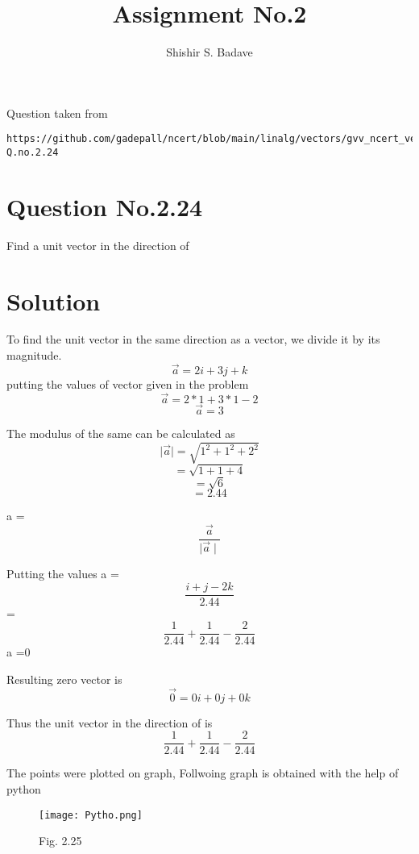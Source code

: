 \documentclass[journal,12pt,twocolumn]{IEEEtran}
\begin{document}
\makeatother
\let\StandardTheFigure\thefigure
\let\vec\mathbf
\renewcommand{\thefigure}{\theproblem}
\def\putbox#1#2#3{\makebox[0in][l]{\makebox[#1][l]{}\raisebox{\baselineskip}[0in][0in]{\raisebox{#2}[0in][0in]{#3}}}}
     \def\rightbox#1{\makebox[0in][r]{#1}}
     \def\centbox#1{\makebox[0in]{#1}}
     \def\topbox#1{\raisebox{-\baselineskip}[0in][0in]{#1}}
     \def\midbox#1{\raisebox{-0.5\baselineskip}[0in][0in]{#1}}
\vspace{3cm}
\title{Assignment No.2}
\author{Shishir S. Badave}
\maketitle
\newpage
\bigskip
\renewcommand{\thefigure}{\theenumi}
\renewcommand{\thetable}{\theenumi}

Question taken from
\begin{lstlisting}
https://github.com/gadepall/ncert/blob/main/linalg/vectors/gvv_ncert_vectors.pdf- Q.no.2.24 
\end{lstlisting}
%
\section{Question No.2.24}
Find a unit vector in the direction of 
\section{Solution}
To find the unit vector in the same direction as a vector, we divide it by its magnitude.
$$\overrightarrow a=2i+3j+k $$
putting the values of vector given in the problem
$$\overrightarrow a=2*1+3*1-2 $$
$$\overrightarrow a=3 $$

The modulus of the same can be calculated as
\newline
$$\mid \overrightarrow a \mid = \sqrt{1^2+1^2+2^2} $$
$$=\sqrt{1+1+4} $$
$$=\sqrt{6} $$ $$=  2.44 $$

 a
  = $$ \dfrac{{\overrightarrow a}}{\mid \overrightarrow a \mid} $$
  
  Putting the values
  \newline
  \newline a
  = $$ \dfrac{{i+j-2k}}{2.44} $$
  =$$ \dfrac{{1}}{2.44}+\dfrac{{1}}{2.44}-\dfrac{{2}}{2.44} $$
  \newline a
  =0
 
  Resulting zero vector is
  \newline
  $$ \overrightarrow 0=0i+0j+0k $$
  
  Thus the unit vector in the direction of  is 
  \newline
 $$ \dfrac{{1}}{2.44}+\dfrac{{1}}{2.44}-\dfrac{{2}}{2.44} $$
  
The points were plotted on graph, Follwoing graph is obtained with the help of python

\begin{figure}[ht]
    \centering
    \texttt{[image: Pytho.png]}
    \caption{Fig. 2.25}
    \label{Graphical solution}
  \end{figure}
  
\end{document}
